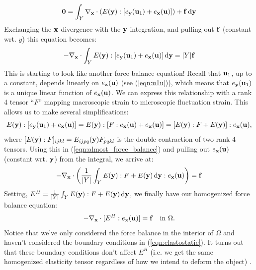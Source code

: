 \documentclass[10pt]{article}
\begin{document}
$$
{\bf 0} = \int_Y \nabla_{\bf x} \cdot (E({\bf y}) : [e_{\bf y}({\bf u}_1) + e_{\bf x}({\bf u})]) + {\bf f} \, \mathrm{d} {\bf y}
$$
Exchanging the ${\bf x}$ divergence with the ${\bf y}$ integration, and pulling
out ${\bf f}$ (constant wrt. $y$) this equation becomes:
\begin{equation}
\label{eqn:almost_force_balance}
-\nabla_{\bf x} \cdot \int_Y E({\bf y}) : [e_{\bf y}({\bf u}_1) + e_{\bf x}({\bf u})] \, \mathrm{d} {\bf y} = |Y| {\bf f}
\end{equation}
This is starting to look like another force balance equation! Recall that ${\bf
u}_1$, up to a constant, depends linearly on $e_{\bf x}({\bf u})$ (see
(\ref{eqn:u1u})), which means that $e_{\bf y}({\bf u}_1)$ is a unique linear
function of $e_{\bf x}({\bf u})$. We can express this relationship with a rank
4 tensor ``$F$'' mapping macroscopic strain to microscopic fluctuation strain.
This allows us to make several simplifications:
$$
E({\bf y}) : [e_{\bf y}({\bf u}_1) + e_{\bf x}({\bf u})] = 
E({\bf y}) : [F : e_{\bf x}({\bf u}) + e_{\bf x}({\bf u})] = 
[E({\bf y}): F + E({\bf y})] : e_{\bf x}({\bf u}),
$$
where $[E({\bf y}) : F]_{ijkl} = E_{ijpq}({\bf y}) F_{pqkl}$ is the double
contraction of two rank 4 tensors. Using this in
(\ref{eqn:almost_force_balance}) and pulling out $e_{\bf x}({\bf u})$ (constant
wrt. ${\bf y}$) from the integral, we arrive at:
$$
-\nabla_{\bf x} \cdot \left( \frac{1}{|Y|} \int_Y E({\bf y}) : F + E({\bf y}) \, \mathrm{d} {\bf y} : e_{\bf x}({\bf u}) \right) = {\bf f}
$$
Setting, $E^H = \frac{1}{|Y|} \int_Y E({\bf y}) : F + E({\bf y}) \, \mathrm{d}
{\bf y}$, we finally have our homogenized force balance equation:
\begin{equation}
    \label{eqn:homogenized}
    -\nabla_{\bf x} \cdot [E^H : e_{\bf x}({\bf u}) ] = {\bf f} \quad \text{in } \Omega.
\end{equation}
Notice that we've only considered the force balance in the interior of $\Omega$
and haven't considered the boundary conditions in (\ref{eqn:elastostatic}). It
turns out that these boundary conditions don't affect $E^H$ (i.e. we get the same
homogenized elasticity tensor regardless of how we intend to deform the object)
\cite[Remark 3.1]{defranceschi1993}.
\end{document}
